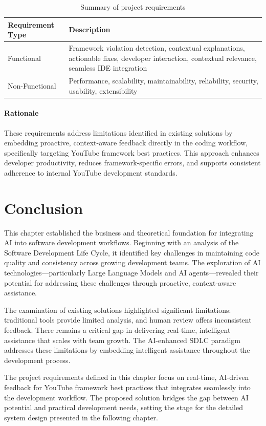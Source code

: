 \begin{spacing}{1.2}
\begin{table}[H]
\centering
\begin{tabular}{|p{6cm}|p{8cm}|}
\hline
\textbf{Requirement Type} & \textbf{Description} \\
\hline
Functional & Framework violation detection, contextual explanations, actionable fixes, developer interaction, contextual relevance, seamless IDE integration \\
\hline
Non-Functional & Performance, scalability, maintainability, reliability, security, usability, extensibility \\
\hline
\end{tabular}
\caption{Summary of project requirements}
\label{tab:extended_requirements}
\end{table}

\paragraph{Rationale}
These requirements address limitations identified in existing solutions by embedding proactive, context-aware feedback directly in the coding workflow, specifically targeting YouTube framework best practices. This approach enhances developer productivity, reduces framework-specific errors, and supports consistent adherence to internal YouTube development standards.


\section*{Conclusion}
This chapter established the business and theoretical foundation for integrating AI into software development workflows. Beginning with an analysis of the Software Development Life Cycle, it identified key challenges in maintaining code quality and consistency across growing development teams. The exploration of AI technologies—particularly Large Language Models and AI agents—revealed their potential for addressing these challenges through proactive, context-aware assistance.

The examination of existing solutions highlighted significant limitations: traditional tools provide limited analysis, and human review offers inconsistent feedback. There remains a critical gap in delivering real-time, intelligent assistance that scales with team growth. The AI-enhanced SDLC paradigm addresses these limitations by embedding intelligent assistance throughout the development process.

The project requirements defined in this chapter focus on real-time, AI-driven feedback for YouTube framework best practices that integrates seamlessly into the development workflow. The proposed solution bridges the gap between AI potential and practical development needs, setting the stage for the detailed system design presented in the following chapter.  








\end{spacing}


